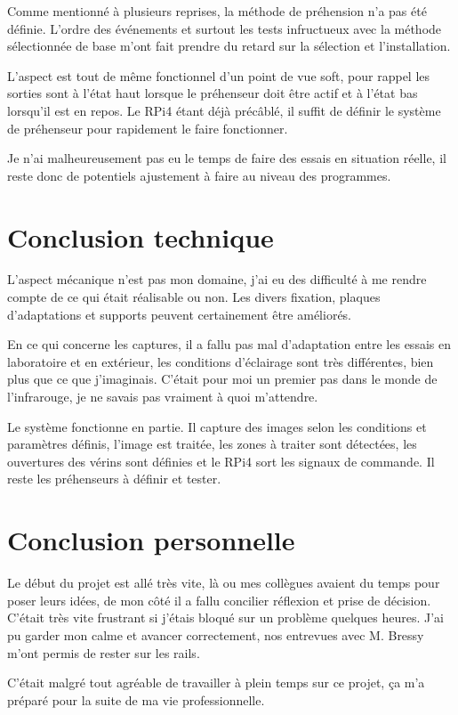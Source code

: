 Comme mentionné à plusieurs reprises, la méthode de préhension n'a pas été définie. L'ordre des événements et surtout les tests infructueux avec la méthode sélectionnée de base
m'ont fait prendre du retard sur la sélection et l'installation.

L'aspect est tout de même fonctionnel d'un point de vue soft, pour rappel les sorties sont à l'état haut lorsque le préhenseur doit être actif et à l'état bas lorsqu'il est en repos.
Le RPi4 étant déjà précâblé, il suffit de définir le système de préhenseur pour rapidement le faire fonctionner.

Je n'ai malheureusement pas eu le temps de faire des essais en situation réelle, il reste donc de potentiels ajustement à faire au niveau des programmes.

\section{Conclusion technique}
L'aspect mécanique n'est pas mon domaine, j'ai eu des difficulté à me rendre compte de ce qui était réalisable ou non.
Les divers fixation, plaques d'adaptations et supports peuvent certainement être améliorés.

En ce qui concerne les captures, il a fallu pas mal d'adaptation entre les essais en laboratoire et en extérieur, les conditions d'éclairage sont très différentes,
bien plus que ce que j'imaginais. C'était pour moi un premier pas dans le monde de l'infrarouge, je ne savais pas vraiment à quoi m'attendre.

Le système fonctionne en partie. Il capture des images selon les conditions et paramètres définis, l'image est traitée, les zones à traiter sont détectées,
les ouvertures des vérins sont définies et le RPi4 sort les signaux de commande. Il reste les préhenseurs à définir et tester.
\section{Conclusion personnelle}
Le début du projet est allé très vite, là ou mes collègues avaient du temps pour poser leurs idées, de mon côté il a fallu concilier réflexion et prise de décision.
C'était très vite frustrant si j'étais bloqué sur un problème quelques heures. J'ai pu garder mon calme et avancer correctement, nos entrevues avec M. Bressy m'ont permis de rester sur les rails.

C'était malgré tout agréable de travailler à plein temps sur ce projet, ça m'a préparé pour la suite de ma vie professionnelle.

